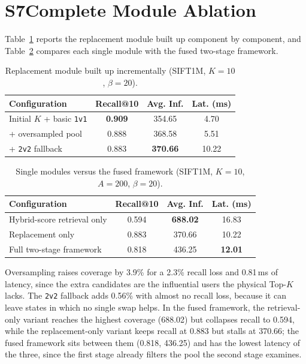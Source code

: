 \documentclass[conference]{IEEEtran}
\begin{document}
\section*{S7\quad Complete Module Ablation}
\label{sec:s7}

Table~\ref{tab:s7-a} reports the replacement module built up component by
component, and Table~\ref{tab:s7-b} compares each single module with the fused
two-stage framework.

\begin{table}[h]
\caption{Replacement module built up incrementally (SIFT1M, $K{=}10$,
$\beta{=}20$).}
\label{tab:s7-a}
\begin{center}
\begin{tabular}{|l|c|c|c|}
\hline
\textbf{Configuration} & \textbf{Recall@10} & \textbf{Avg. Inf.} & \textbf{Lat. (ms)} \\
\hline
Initial $K$ + basic \texttt{1v1} & \textbf{0.909} & 354.65 & 4.70 \\
+ oversampled pool              & 0.888 & 368.58 & 5.51 \\
+ \texttt{2v2} fallback          & 0.883 & \textbf{370.66} & 10.22 \\
\hline
\end{tabular}
\end{center}
\end{table}

\begin{table}[h]
\caption{Single modules versus the fused framework (SIFT1M, $K{=}10$,
$A{=}200$, $\beta{=}20$).}
\label{tab:s7-b}
\begin{center}
\begin{tabular}{|l|c|c|c|}
\hline
\textbf{Configuration} & \textbf{Recall@10} & \textbf{Avg. Inf.} & \textbf{Lat. (ms)} \\
\hline
Hybrid-score retrieval only & 0.594 & \textbf{688.02} & 16.83 \\
Replacement only            & 0.883 & 370.66 & 10.22 \\
Full two-stage framework    & 0.818 & 436.25 & \textbf{12.01} \\
\hline
\end{tabular}
\end{center}
\end{table}

Oversampling raises coverage by 3.9\% for a 2.3\% recall loss and 0.81\,ms of
latency, since the extra candidates are the influential users the physical
Top-$K$ lacks. The \texttt{2v2} fallback adds 0.56\% with almost no recall loss,
because it can leave states in which no single swap helps. In the fused
framework, the retrieval-only variant reaches the highest coverage (688.02) but
collapses recall to 0.594, while the replacement-only variant keeps recall at
0.883 but stalls at 370.66; the fused framework sits between them (0.818,
436.25) and has the lowest latency of the three, since the first stage already
filters the pool the second stage examines.
\end{document}
